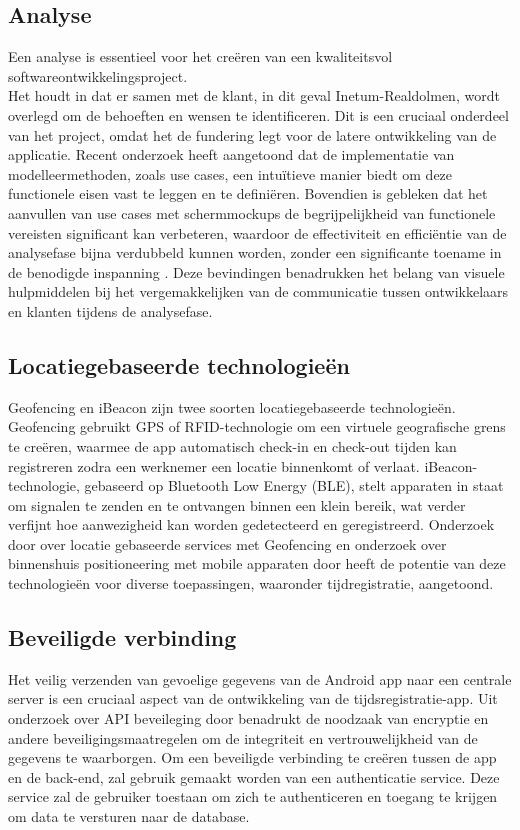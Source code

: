 \subsection{Analyse}
Een analyse is essentieel voor het creëren van een kwaliteitsvol softwareontwikkelingsproject. \\Het houdt in dat er samen met de klant, in dit geval Inetum-Realdolmen, wordt overlegd om de behoeften en wensen te identificeren. Dit is een cruciaal onderdeel van het project, omdat het de fundering legt voor de latere ontwikkeling van de applicatie. Recent onderzoek heeft aangetoond dat de implementatie van modelleermethoden, zoals use cases, een intuïtieve manier biedt om deze functionele eisen vast te leggen en te definiëren. Bovendien is gebleken dat het aanvullen van use cases met schermmockups de begrijpelijkheid van functionele vereisten significant kan verbeteren, waardoor de effectiviteit en efficiëntie van de analysefase bijna verdubbeld kunnen worden, zonder een significante toename in de benodigde inspanning \autocite{EffectScreenMockups}. Deze bevindingen benadrukken het belang van visuele hulpmiddelen bij het vergemakkelijken van de communicatie tussen ontwikkelaars en klanten tijdens de analysefase.

\subsection{Locatiegebaseerde technologieën}
Geofencing en iBeacon zijn twee soorten locatiegebaseerde technologieën. Geofencing gebruikt GPS of RFID-technologie om een virtuele geografische grens te creëren, waarmee de app automatisch check-in en check-out tijden kan registreren zodra een werknemer een locatie binnenkomt of verlaat. iBeacon-technologie, gebaseerd op Bluetooth Low Energy (BLE), stelt apparaten in staat om signalen te zenden en te ontvangen binnen een klein bereik, wat verder verfijnt hoe aanwezigheid kan worden gedetecteerd en geregistreerd. Onderzoek door \textcite{Singh2018Geofencing} over locatie gebaseerde services met Geofencing en onderzoek over binnenshuis positioneering met mobile apparaten door \textcite{iBeaconDeployment} heeft de potentie van deze technologieën voor diverse toepassingen, waaronder tijdregistratie, aangetoond.

\subsection{Beveiligde verbinding}
Het veilig verzenden van gevoelige gegevens van de Android app naar een centrale server is een cruciaal aspect van de ontwikkeling van de tijdsregistratie-app. Uit onderzoek over API beveileging door \textcite{APISecurity} benadrukt de noodzaak van encryptie en andere beveiligingsmaatregelen om de integriteit en vertrouwelijkheid van de gegevens te waarborgen.
Om een beveiligde verbinding te creëren tussen de app en de back-end, zal gebruik gemaakt worden van een authenticatie service. Deze service zal de gebruiker toestaan om zich te authenticeren en toegang te krijgen om data te versturen naar de database.

